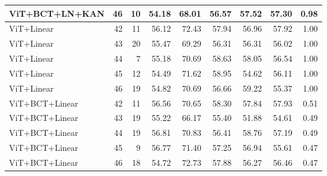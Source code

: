 \documentclass[10pt]{article}
\begin{document}
\begin{longtable}{lrrrrrrrr}
ViT+BCT+LN+KAN & 46 & 10 & 54.18 & 68.01 & 56.57 & 57.52 & 57.30 & 0.98 \\
\midrule
ViT+Linear & 42 & 11 & 56.12 & 72.43 & 57.94 & 56.96 & 57.92 & 1.00 \\
ViT+Linear & 43 & 20 & 55.47 & 69.29 & 56.31 & 56.31 & 56.02 & 1.00 \\
ViT+Linear & 44 & 7 & 55.18 & 70.69 & 58.63 & 58.05 & 56.54 & 1.00 \\
ViT+Linear & 45 & 12 & 54.49 & 71.62 & 58.95 & 54.62 & 56.11 & 1.00 \\
ViT+Linear & 46 & 19 & 54.82 & 70.69 & 56.66 & 59.22 & 55.37 & 1.00 \\
\midrule
ViT+BCT+Linear & 42 & 11 & 56.56 & 70.65 & 58.30 & 57.84 & 57.93 & 0.51 \\
ViT+BCT+Linear & 43 & 19 & 55.22 & 66.17 & 55.40 & 51.88 & 54.61 & 0.49 \\
ViT+BCT+Linear & 44 & 19 & 56.81 & 70.83 & 56.41 & 58.76 & 57.19 & 0.49 \\
ViT+BCT+Linear & 45 & 9 & 56.77 & 71.40 & 57.25 & 56.94 & 55.61 & 0.47 \\
ViT+BCT+Linear & 46 & 18 & 54.72 & 72.73 & 57.88 & 56.27 & 56.46 & 0.47 \\
\end{longtable}
\vspace{-6pt}{\footnotesize Interaction (BCT loss of KAN minus BCT loss of linear head, Welch--Satterthwaite): selected: 2.80 [0.15, 5.45], $p=0.040$; last: 5.32 [1.10, 9.54], $p=0.018$; last5: 4.93 [2.44, 7.41], $p=0.001$.\par}
\normalsize
\end{document}
